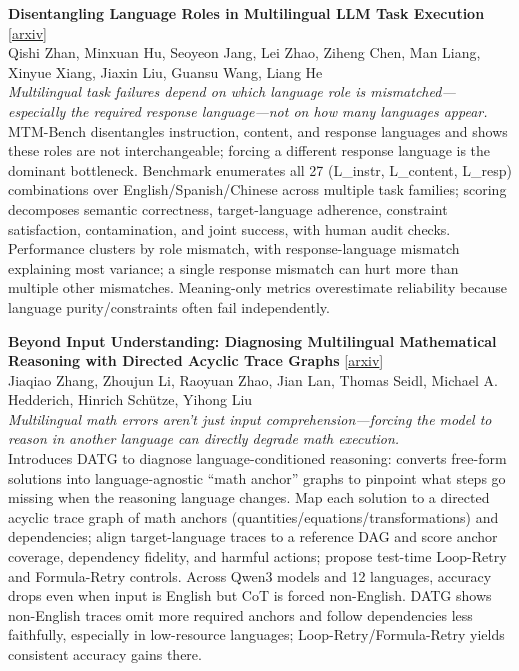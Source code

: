 \documentclass[12pt,letterpaper]{article}
\begin{document}
\medskip

{\small\textbf{Disentangling Language Roles in Multilingual LLM Task Execution}} {\scriptsize[\href{https://arxiv.org/abs/2605.27649}{arxiv}]}\\
{\scriptsize Qishi Zhan, Minxuan Hu, Seoyeon Jang, Lei Zhao, Ziheng Chen, Man Liang, Xinyue Xiang, Jiaxin Liu, Guansu Wang, Liang He}\\

{\small\textit{Multilingual task failures depend on which language role is mismatched---especially the required response language---not on how many languages appear.}}\\[1pt]
{\footnotesize MTM-Bench disentangles instruction, content, and response languages and shows these roles are not interchangeable; forcing a different response language is the dominant bottleneck. Benchmark enumerates all 27 (L\_instr, L\_content, L\_resp) combinations over English/Spanish/Chinese across multiple task families; scoring decomposes semantic correctness, target-language adherence, constraint satisfaction, contamination, and joint success, with human audit checks. Performance clusters by role mismatch, with response-language mismatch explaining most variance; a single response mismatch can hurt more than multiple other mismatches. Meaning-only metrics overestimate reliability because language purity/constraints often fail independently.}

\medskip

{\small\textbf{Beyond Input Understanding: Diagnosing Multilingual Mathematical Reasoning with Directed Acyclic Trace Graphs}} {\scriptsize[\href{https://arxiv.org/abs/2605.27715}{arxiv}]}\\
{\scriptsize Jiaqiao Zhang, Zhoujun Li, Raoyuan Zhao, Jian Lan, Thomas Seidl, Michael A. Hedderich, Hinrich Sch\"utze, Yihong Liu}\\

{\small\textit{Multilingual math errors aren't just input comprehension---forcing the model to reason in another language can directly degrade math execution.}}\\[1pt]
{\footnotesize Introduces DATG to diagnose language-conditioned reasoning: converts free-form solutions into language-agnostic ``math anchor'' graphs to pinpoint what steps go missing when the reasoning language changes. Map each solution to a directed acyclic trace graph of math anchors (quantities/equations/transformations) and dependencies; align target-language traces to a reference DAG and score anchor coverage, dependency fidelity, and harmful actions; propose test-time Loop-Retry and Formula-Retry controls. Across Qwen3 models and 12 languages, accuracy drops even when input is English but CoT is forced non-English. DATG shows non-English traces omit more required anchors and follow dependencies less faithfully, especially in low-resource languages; Loop-Retry/Formula-Retry yields consistent accuracy gains there.}
\end{document}
